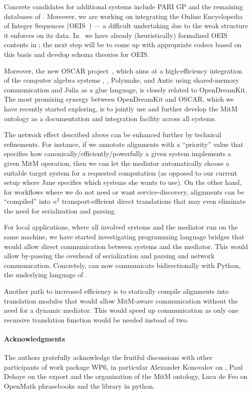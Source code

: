 Concrete candidates for additional systems include PARI GP and the remaining databases of \lmfdb.
Moreover, we are working on integrating the Online Encyclopedia of Integer Sequences (OEIS~\cite{Sloane:OEIS,oeis}) --- a difficult undertaking due to the weak structure it enforces on its data.
In~\cite{LuzKoh:fsarfo16} we have already (heuristically) formalized OEIS contents in \ommt; the next step will be to come up with appropriate codecs based on this basis and develop schema theories for OEIS.

Moreover, the new OSCAR project~\cite{OSCAR:on}, which aims at a high-efficiency integration of the computer algebra systems \GAP, \Singular, Polymake, and Antic using shared-memory communication and Julia as a glue language, is closely related to OpenDreamKit.
The most promising synergy between OpenDreamKit and OSCAR, which we have recently started exploring, is to jointly use and further develop the MitM ontology as a documentation and integration facility across all systems.

The network effect described above can be enhanced further by technical refinements.
For instance, if we annotate alignments with a ``priority'' value that specifies how canonically/efficiently/powerfully a given system implements a given MitM operation, then we can let the \MMT mediator automatically choose a suitable target system for a requested computation (as opposed to our current setup where Jane specifies which systems she wants to use).
On the other hand, for workflows where we do not need or want service-discovery, alignments can be ``compiled'' into $n^2$ transport-efficient direct translations that may even eliminate the need for serialization and parsing.

For local applications, where all involved systems and the mediator run on the same machine, we have started investigating programming language bridges that would allow direct communication between systems and the \MMT mediator.
This would allow by-passing the overhead of serialization and parsing and network communication.
Concretely, \MMT can now communicate bidirectionally with Python, the underlying language of \Sage.

Another path to increased efficiency is to statically compile alignments into translation modules that would allow MitM-aware communication without the need for a dynamic mediator.
This would speed up communication as only one recursive translation function would be needed instead of two.

\paragraph*{Acknowledgments}
The authors gratefully acknowledge the fruitful discussions with other participants of
work package WP6, in particular Alexander Konovalov on \SCSCP, Paul Dehaye on the \Sage
export and the organization of the MitM ontology, Luca de Feo on OpenMath phrasebooks
and the \SCSCP library in python.

